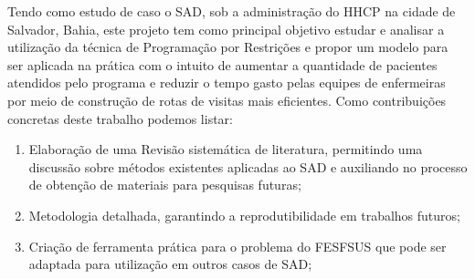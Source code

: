 { }%


Tendo como estudo de caso o \ac{SAD}, sob a administração do \ac{HHCP} na cidade de Salvador, Bahia, este projeto tem como principal objetivo estudar e analisar a utilização da técnica de Programação por Restrições e propor um modelo para ser aplicada na prática com o intuito de aumentar a quantidade de pacientes atendidos pelo programa e reduzir o tempo gasto pelas equipes de enfermeiras por meio de construção de rotas de visitas mais eficientes. Como contribuições concretas deste trabalho podemos listar:

\begin{enumerate}
\item Elaboração de uma Revisão sistemática de literatura, permitindo uma discussão sobre métodos existentes aplicadas ao \ac{SAD} e auxiliando no processo de obtenção de materiais para pesquisas futuras;
\item Metodologia detalhada, garantindo a reprodutibilidade em trabalhos futuros;
\item Criação de ferramenta prática para o problema do \ac{FESFSUS} que pode ser adaptada para utilização em outros casos de \ac{SAD};
\end{enumerate}



